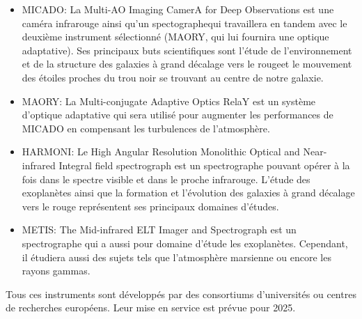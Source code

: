 \begin{itemize}
	
	\item MICADO: La Multi-AO Imaging CamerA for Deep Observations est une caméra infrarouge ainsi qu'un spectographe\footnotemark[2] qui travaillera en tandem avec le deuxième instrument sélectionné (MAORY, qui lui fournira une optique adaptative). Ses principaux buts scientifiques sont l'étude de l'environnement et de la structure des galaxies à grand décalage vers le rouge\footnotemark[3] et le mouvement des étoiles proches du trou noir se trouvant au centre de notre galaxie. 
	
	\item MAORY: La Multi-conjugate Adaptive Optics RelaY est un système d'optique adaptative qui sera utilisé pour augmenter les performances de MICADO en compensant les turbulences de l'atmosphère.
	
	\item HARMONI: Le High Angular Resolution Monolithic Optical and Near-infrared Integral field spectrograph est un spectrographe pouvant opérer à la fois dans le spectre visible et dans le proche infrarouge. L'étude des exoplanètes ainsi que la formation et l'évolution des galaxies à grand décalage vers le rouge représentent ses principaux domaines d'études.
	
	\item METIS: The Mid-infrared ELT Imager and Spectrograph est un spectrographe qui a aussi pour domaine d'étude les exoplanètes. Cependant, il étudiera aussi des sujets tels que l'atmosphère marsienne ou encore les rayons gammas.
	
\end{itemize}

Tous ces instruments sont développés par des consortiums d'universités ou centres de recherches européens. Leur mise en service est prévue pour 2025.
	
\vfill


\newpage

